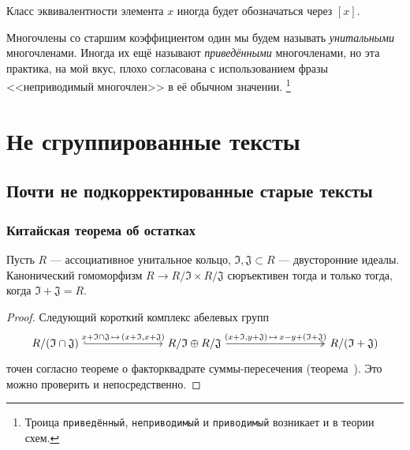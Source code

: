 \documentclass[
	extrafontsizes,
	11pt,
	hyphens,
]{memoir}
\begin{document}
\begin{notation}
Класс эквивалентности элемента \(x\) иногда будет обозначаться через \([x]\).
\end{notation}

\begin{convention}
Многочлены со старшим коэффициентом один мы будем называть \emph{унитальными} многочленами.
Иногда их ещё называют \emph{приведёнными} многочленами, но эта практика, на мой вкус, плохо согласована с использованием фразы <<неприводимый многочлен>> в её обычном значении.%
\footnote{Троица \texttt{приведённый}, \texttt{неприводимый} и \texttt{приводимый} возникает и в теории схем.}
\end{convention}




\mainmatter*


\pagestyle{main}




\part{Не сгруппированные тексты}



\chapter{Почти не подкорректированные старые тексты}


\section{Китайская теорема об остатках}

\begin{lemma}
\label{lem:gen_chi_rem}
Пусть \(R\) --- ассоциативное унитальное кольцо, \(\mathfrak{I}, \mathfrak{J} \subset R\) --- двусторонние идеалы.
Канонический гомоморфизм \(R \to R/\mathfrak{I} \times R/\mathfrak{J}\) сюръективен тогда и только тогда, когда \(\mathfrak{I} + \mathfrak{J} = R\).
\end{lemma}

\begin{proof}
Следующий короткий комплекс абелевых групп
\begin{equation*}
\begin{tikzcd}[column sep = scriptsize]
R / (\mathfrak{I} \cap \mathfrak{J})
\ar[hookrightarrow]{rrrr}{x + \mathfrak{I} \cap \mathfrak{J} \,\mapsto\, (x + \mathfrak{I}, x + \mathfrak{J})}
& & & &
R/\mathfrak{I} \oplus R/\mathfrak{J}
\ar[twoheadrightarrow]{rrrrr}{(x + \mathfrak{I}, y + \mathfrak{J}) \,\mapsto\, x - y + (\mathfrak{I} + \mathfrak{J})}
& & & & &
R / (\mathfrak{I} + \mathfrak{J})
\end{tikzcd}
\end{equation*}
точен согласно теореме о факторквадрате сум\-мы-пе\-ре\-се\-че\-ния (теорема~). Это можно проверить и непосредственно.
\end{proof}
\end{document}
